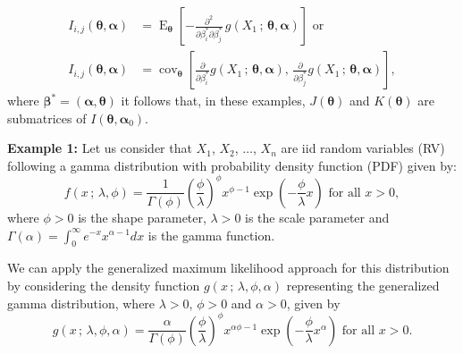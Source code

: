 \documentclass[12pt]{article} %
\newcommand{\bs}{\boldsymbol}
\newcommand{\on}{\operatorname}
\theoremstyle{definition}
\begin{document}
 \begin{equation}\label{eqj}
 \begin{aligned}I_{i,j}(\bs{\theta},\bs{\alpha})&=
 \on{E}_{\bs{\theta}} \left[-\frac{\partial^2}{\partial \beta^*_i \partial\beta^*_j}\, g(X_1\, ;\, \bs{\theta},\bs{\alpha})\right]\mbox{ or}\\
 I_{i,j}(\bs{\theta},\bs{\alpha}) &=  \on{cov}_{\bs{\theta}} \left[\frac{\partial}{\partial \beta^*_i} g(X_1\, ;\, \bs{\theta}, \bs{\alpha}),\, \frac{\partial}{\partial \beta^*_j} g(X_1\, ;\, \bs{\theta},\bs{\alpha})\right],
 \end{aligned}
 \end{equation}
where $\bs{\beta}^*=(\bs{\alpha},\bs{\theta})$ it follows that, in these examples, $J(\bs{\theta})$ and $K(\bs{\theta})$ are submatrices of $I(\bs{\theta},\bs{\alpha}_0)$.

\noindent\textbf{Example 1:} Let us consider that $X_1$, $X_2$, $\ldots$, $X_n$   are iid random variables (RV) following a gamma distribution with probability density function (PDF) given by:
\begin{equation}\label{fdpgamma}
f(x\,;\,\lambda,\phi)=\frac{1}{\Gamma(\phi)}\left(\frac{\phi}{\lambda} \right)^{\phi} x^{\phi-1}\exp\left(-\frac{\phi}{\lambda} x \right)\mbox{ for all }x>0,
\end{equation}
where $\phi>0$ is the shape parameter,  $\lambda>0$ is the scale parameter and $\Gamma(\alpha)=\int_{0}^{\infty}{e^{-x}x^{\alpha-1}dx}$ is the  gamma function.

We can apply the generalized maximum likelihood approach for this distribution by considering the density function $g(x\,;\,\lambda,\phi,\alpha)$ representing the generalized gamma distribution,  where $\lambda>0$, $\phi>0$ and $\alpha>0$, given by
\begin{equation}\label{g}g(x\,;\,\lambda,\phi,\alpha)=\frac{\alpha}{\Gamma(\phi)}\left(\frac{\phi}{\lambda} \right)^\phi x^{\alpha\phi-1}\exp\left(-\frac{\phi}{\lambda} x^\alpha \right)\mbox{ for all }x>0.
\end{equation}
\end{document}

